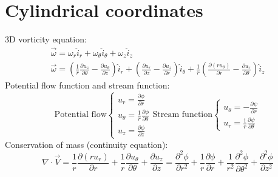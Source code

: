 \documentclass[class=report, crop=false, 12pt,a4paper]{standalone}
\begin{document}
\section{Cylindrical coordinates}
3D vorticity equation:
\begin{gather}
  \vec{\omega} = \omega_r \hat{i}_r + \omega_{\theta} \hat{i}_{\theta} + \omega_z \hat{i}_z\\
  \vec{\omega} = \left(\frac{1}{r}\frac{\partial u_z}{\partial \theta} - \frac{\partial u_{\theta}}{\partial z}\right) \hat{i}_r + \left(\frac{\partial u_r}{\partial z} - \frac{\partial u_z}{\partial r}\right) \hat{i}_{\theta} + \frac{1}{r}\left(\frac{\partial (ru_{\theta})}{\partial r}-\frac{\partial u_r}{\partial \theta}\right)\hat{i}_z
\end{gather}
Potential flow function and stream function:
\begin{equation}
  \textrm{Potential flow}\begin{cases}
    u_r = \frac{\partial \phi}{\partial r}\\
    u_{\theta} = \frac{1}{r}\frac{\partial \phi}{\partial \theta}\\
    u_z = \frac{\partial \phi}{\partial z}
  \end{cases}
  \textrm{Stream function}\begin{cases}
    u_{\theta} = - \frac{\partial \psi}{\partial r}\\
    u_r = \frac{1}{r} \frac{\partial \psi}{\partial \theta}
  \end{cases}
\end{equation}
Conservation of mass (continuity equation):
\begin{equation}
  \nabla \cdot \vec{V} = \frac{1}{r} \frac{\partial (r u_r)}{\partial r} + \frac{1}{r} \frac{\partial u_{\theta}}{\partial \theta} + \frac{\partial u_z}{\partial z} = \frac{\partial^2 \phi}{\partial r^2} + \frac{1}{r}\frac{\partial \phi}{\partial r} +\frac{1}{r^2} \frac{\partial^2 \phi}{\partial \theta^2} + \frac{\partial^2 \phi}{\partial z^2}
\end{equation}
\end{document}
